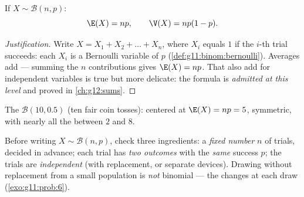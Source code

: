 \begin{proposition}\label{prop:g11:binom:expectation}
If $X \sim \mathcal B(n, p)$:
\[
\E(X) = np,
\qquad
\V(X) = np(1-p).
\]
\end{proposition}

\begin{proof}[Justification]
Write $X = X_1 + X_2 + \dots + X_n$, where $X_i$ equals $1$ if the
$i$-th trial succeeds: each $X_i$ is a Bernoulli variable of 
$p$ (\cref{def:g11:binom:bernoulli}). Averages add --- summing the $n$
contributions gives $\E(X) = np$. That \emph{} also add for
independent variables is true but more delicate: the  formula is
\emph{admitted at this level} and proved in \cref{ch:g12:sums}.
\end{proof}

\begin{omfigure}

{\small The  $\mathcal B(10, 0.5)$ (ten fair coin tosses):
centered at $\E(X) = np = 5$, symmetric, with nearly all the 
between $2$ and $8$.}
\end{omfigure}

\begin{method}\label{met:g11:binom:recognize}
Before writing $X \sim \mathcal B(n, p)$, check three ingredients: a
\emph{fixed number} $n$ of trials, decided in advance; each trial has
\emph{two outcomes} with the \emph{same} success  $p$; the
trials are \emph{independent} (with replacement, or separate devices).
Drawing without replacement from a small population is \emph{not}
binomial --- the  changes at each draw
(\cref{exo:g11:prob:6}).
\end{method}

